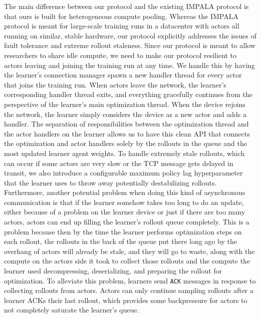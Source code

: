 \documentclass{article}
\begin{document}
The main difference between our protocol and the existing IMPALA protocol is that ours is built for heterogeneous compute pooling.
Whereas the IMPALA protocol is meant for large-scale training runs in a datacenter with actors all running on similar,
stable hardware, our protocol explicitly addresses the issues of fault tolerance and extreme rollout staleness. Since our
protocol is meant to allow researchers to share idle compute, we need to make our protocol resilient to actors leaving and joining
the training run at any time. We handle this by having the learner's connection manager spawn a new handler thread for every actor
that joins the training run. When actors leave the network, the learner's corresponding handler thread exits, and everything
gracefully continues from the perspective of the learner's main optimization thread. When the device rejoins the network, the learner
simply considers the device as a new actor and adds a handler. The separation of responsibilities between the optimization thread
and the actor handlers on the learner allows us to have this clean API that connects the optimization and actor
handlers solely by the rollouts in the queue and the most updated learner agent weights. To handle extremely stale
rollouts, which can occur if some actors are very slow or the TCP message gets delayed in transit, we also introduce a configurable
maximum policy lag hyperparameter that the learner uses to throw away potentially destabilizing rollouts. Furthermore, another
potential problem when doing this kind of asynchronous communication is that if the learner somehow takes too long to do an update,
either because of a problem on the learner device or just if there are too many actors, actors can end up filling the learner's
rollout queue completely. This is a problem because then by the time the learner performs optimization steps on each rollout, the
rollouts in the back of the queue put there long ago by the overhang of actors will already be stale, and they will go to waste,
along with the compute on the actors side it took to collect those rollouts and the compute the learner used decompressing, deserializing,
and preparing the rollout for optimization. To alleviate this problem, learners send \verb|ACK| messages in response to collecting
rollouts from actors. Actors can only continue sampling rollouts after a learner ACKs their last rollout, which provides some
backpressure for actors to not completely saturate the learner's queue.
\end{document}
